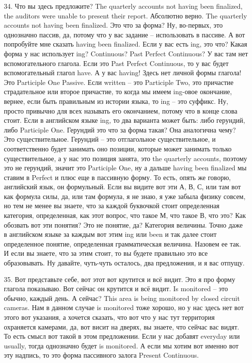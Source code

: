\documentclass[main.tex]{subfiles}
\begin{document}
34. Что вы здесь предложите?
The quarterly accounts not having been finalized, the auditors were unable to present their report.
Абсолютно верно.
The quarterly accounts not having been finalized.
Это что за форма?
Ну, во-первых, это однозначно пассив, да, потому что у вас задание -- использовать в пассиве.
А вот попробуйте мне сказать having been finalized.
Если у вас есть ing, это что?
Какая форма у нас использует ing?
Continuous? Past Perfect Continuous?
У вас там нет вспомогательного глагола.
Если это Past Perfect Continuous, то у вас будет вспомогательный глагол have.
А у вас having!
Здесь нет личной формы глагола!
Это Participle One Passive.
Если written -- это Participle Two, это причастие страдательное или второе причастие, то когда мы имеем ing-овое окончание, вернее, если быть правильным из истории языка, то ing -- это суффикс.
Ну, просто привычно для всех называть его окончанием, потому что в конце слова стоит.
Если в английском языке ing, то два варианта может быть: либо герундий, либо Participle One.
Герундий это что за форма такая?
Она аналогична чему?
Это существительное.
Герундий -- это отглагольное существительное, и соответственно будет занимать оно позиции, которые может занимать только существительное, а у нас это позиция занята, это the quarterly accounts, поэтому это не герундий, значит это Participle One, ну а дальше having been finalized мы ставим в Perfect и плюс еще в пассивную форму.
То есть, опять же говорю, английский язык, он формульный.
Если вы видите вот эти А, В, С, или там вот как формула силы, да, или там формула, я не знаю, я уже забыла физику совсем, но тем не менее вы знаете, что за каждой буквочкой стоит определенная категория, определенная, как этот вопрос, что такое М, что такое В, что это? Как обозвать вот эти понятия? Это не понятие, да? Категория величины.
Точно даже в английском языке за каждым вот этим ing или been и так далее стоит определенное понятие, определенная грамматическая величина.
Назовем ее так.
И если вы знаете, что за этим стоит, то вы будете правильно это все образовывать.
Ну давайте, чуть-чуть осталось, два предложения, и я вас отпущу.

35.
Вот представьте себе, вот этот вот крутится и всё видит.
Это я про форму глагола показываю.
Вот сейчас он крутится и всё видит.
Is monitored -- это обычно, каждый день.
А сейчас?
This area is being monitored by closed circuit cameras.
Нам в данном случае is monitored тоже хорошо, но у нас здесь нет вот этого вот указания, а хочется сказать, что вот что у нас тут территория охраняется камерами, да, вот висит на дверях, вы знаете, что сейчас вас видят.
То есть смысл вот такой в этом предложении.
Если у нас добавят everyday или usually, тогда однозначно будет is monitored.
А если мы хотим вот именно вот эту надпись, то это форма пассивного залога Present Continuous.
\end{document}
